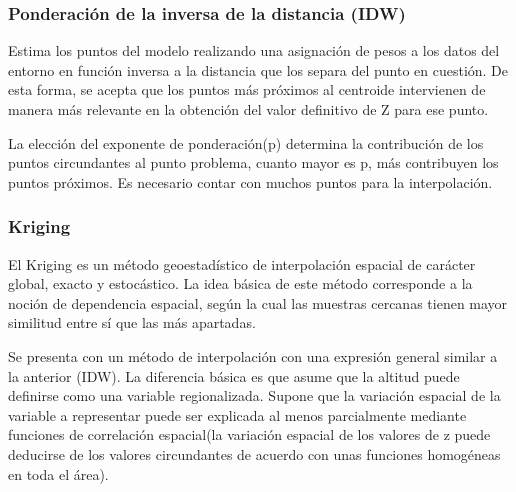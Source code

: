 \subsubsection{Ponderación de la inversa de la distancia (IDW)}
Estima los puntos del modelo realizando una asignación de pesos a los datos del entorno en función inversa a la
distancia que los separa del punto en cuestión. De esta forma, se acepta que los puntos más próximos al centroide
intervienen de manera más relevante en la obtención del valor definitivo de Z para ese punto.

La elección del exponente de ponderación(p) determina la contribución de los puntos circundantes al punto 
problema, cuanto mayor es p, más contribuyen los puntos próximos. Es necesario contar con muchos puntos para la
interpolación.

\subsubsection{Kriging}
El Kriging es un método geoestadístico de interpolación espacial de carácter global, exacto y estocástico. La 
idea básica de este método corresponde a la noción de dependencia espacial, según la cual las muestras cercanas
tienen mayor similitud entre sí que las más apartadas\cite{NINO2011}.

Se presenta con un método de interpolación con una expresión general similar a la anterior (IDW). La diferencia
básica es que asume que la altitud puede definirse como una variable regionalizada. Supone que la variación
espacial de la variable a representar puede ser explicada al menos parcialmente mediante funciones de correlación
espacial(la variación espacial de los valores de z puede deducirse de los valores circundantes de acuerdo con unas
funciones homogéneas en toda el área).
